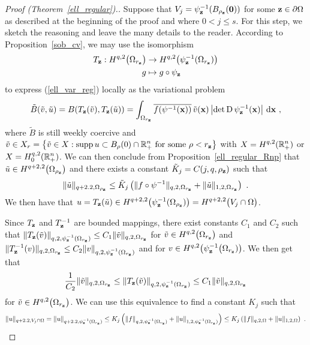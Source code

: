 \begin{proof}[Proof (Theorem~\ref{ell_regular}).]
Suppose that $V_j = \psi_{\mathbf{z}}^{-1}(B_{\rho_{\mathbf{z}}}(\mathbf{0}))$
for some $\mathbf{z} \in \partial \Omega$ as described at the beginning
of the proof and where $0<j \leq s$.  For this step, we sketch the
reasoning and leave the many details to the reader.  According to
Proposition~\ref{sob_cv}, we may use the isomorphism
\begin{align*}
T_{\mathbf{z}}:  H^{q,2}\big(\Omega_{r_{\mathbf{z}}}\big) & \to 
H^{q,2}\big(\psi_{\mathbf{z}}^{-1}(\Omega_{r_{\mathbf{z}}})\big) \\
g &\mapsto g \circ \psi_{\mathbf{z}}
\end{align*}
to express (\ref{ell_var_reg}) locally as the variational problem
\[
\tilde{B}(\tilde{v},\tilde{u})
= B(T_{\VEC{z}}(\tilde{v}),T_{\VEC{z}}(\tilde{u}))
= \int_{\Omega_{r_\VEC{z}}} \overline{f(\psi^{-1}(\VEC{x}))}\,\tilde{v}(\VEC{x})
\left|\det \diff \psi_{\VEC{z}}^{-1}(\VEC{x})\right| \dx{\VEC{x}} \ ,
\]
where $\tilde{B}$ is still weekly coercive and
$\tilde{v} \in \displaystyle X_r = \left\{ \tilde{v} \in X : \operatorname{supp} u \subset
B_\rho(0)\cap \mathbb{R}^n_+ \ \text{for some} \ \rho < r_{\mathbf{z}} \right\}$
with $\displaystyle X = H^{q,2}(\mathbb{R}^n_+)$ or
$\displaystyle X = H^{q,2}_0(\mathbb{R}^n_+)$.
We can then conclude from Proposition~\ref{ell_regular_Rnp} that
$\displaystyle \tilde{u}\in H^{q+2,2}\big(\Omega_{\rho_{\mathbf{z}}}\big)$ and there
exists a constant $\tilde{K}_j = C(j,q,\rho_{\mathbf{z}})$ such that
\[
\|\tilde{u}\|_{q+2.2,\Omega_{\rho_{\mathbf{z}}}} \leq \tilde{K}_j
\left( \|f\circ \psi^{-1}\|_{q,2,\Omega_{r_{\mathbf{z}}}} +
\|\tilde{u}\|_{1,2,\Omega_{r_{\mathbf{z}}}} \right) \ .
\]
We then have that
$\displaystyle u = T_{\mathbf{z}}(\tilde{u}) \in H^{q+2,2}
\big(\psi_{\mathbf{z}}^{-1}(\Omega_{\rho_{\mathbf{z}}})\big)
= H^{q+2,2} \big(V_j \cap \Omega\big)$.

Since $T_{\mathbf{z}}$ and $T_{\mathbf{z}}^{-1}$ are bounded mappings, there
exist constants $C_1$ and $C_2$ such that
$\displaystyle
\|T_{\mathbf{z}}(\tilde{v})\|_{q,2,\psi^{-1}_{\mathbf{z}}(\Omega_{r_{\mathbf{z}}})}
\leq C_1 \|\tilde{v}\|_{q,2,\Omega_{r_{\mathbf{z}}}}$
for $\displaystyle \tilde{v} \in H^{q,2}\big(\Omega_{r_{\mathbf{z}}}\big)$
and
$\displaystyle
\|T_{\mathbf{z}}^{-1}(v)\|_{q,2,\Omega_{r_{\mathbf{z}}}}
\leq C_2 \|v\|_{q,2,\psi^{-1}_{\mathbf{z}}(\Omega_{r_{\mathbf{z}}})}$ and
for $\displaystyle v \in
H^{q,2}\big(\psi_{\mathbf{z}}^{-1}\big(\Omega_{r_{\mathbf{z}}})\big)$.
We then get that
\[
  \frac{1}{C_2} \|\tilde{v}\|_{q,2,\Omega_{r_{\mathbf{z}}}}
\leq \|T_{\mathbf{z}}(\tilde{v})\|_{q,2,\psi^{-1}_{\mathbf{z}}(\Omega_{r_{\mathbf{z}}})}
\leq C_1 \|\tilde{v}\|_{q,2,\Omega_{r_{\mathbf{z}}}}
\]
for $\displaystyle \tilde{v} \in H^{q,2}\big(\Omega_{r_{\mathbf{z}}}\big)$.
We can use this equivalence to find a constant $K_j$ such that
\[
\|u\|_{q+2.2,V_j\cap \Omega}
= \|u\|_{q+2.2,\psi^{-1}_{\VEC{z}}(\Omega_{r_\VEC{z}})}
\leq K_j \left( \|f\|_{q,2,\psi^{-1}_{\VEC{z}}(\Omega_{r_\VEC{z}})} +
\|u\|_{1,2,\psi_\VEC{z}^{-1}(\Omega_{r_\VEC{z}})} \right)
\leq K_j \left( \|f\|_{q,2,\Omega} + \|u\|_{1,2,\Omega} \right) \ .
\]


\end{proof}
